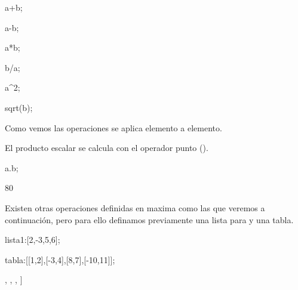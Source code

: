 \begin{maximai}
	a+b;
\end{maximai}\begin{maximao}
	\left[ 7 , 9 , 11 , 13 , 5 \right]
\end{maximao}\begin{maximai}
	a-b;
\end{maximai}\begin{maximao}
	\left[ -5 , -5 , -5 , -5 , 5 \right]
\end{maximao}\begin{maximai}
	a*b;
\end{maximai}\begin{maximao}
	\left[ 6 , 14 , 24 , 36 , 0 \right]
\end{maximao}\begin{maximai}
	b/a;
\end{maximai}\begin{maximao}
\end{maximao}\begin{maximai}
	a^2;
\end{maximai}\begin{maximao}
	\left[ 1 , 4 , 9 , 16 , 25 \right]
\end{maximao}\begin{maximai}
	sqrt(b);
\end{maximai}\begin{maximao}
\end{maximao}

Como vemos las operaciones se aplica elemento a elemento.

El producto escalar se calcula con el operador punto ().
\begin{maximai}
	a.b;
\end{maximai}\begin{maximao}
	80
\end{maximao}

Existen otras operaciones definidas en maxima como las que veremos
a continuación, pero para ello definamos previamente una lista para
y una tabla.

\begin{maximai}
	lista1:[2,-3,5,6];
\end{maximai}\begin{maximao}
	\left[ 2 , -3 , 5 , 6 \right]
\end{maximao}\begin{maximai}
	tabla:[[1,2],[-3,4],[8,7],[-10,11]];
\end{maximai}\begin{maximao}
	\left[ \left[ 1 , 2 \right]  , \left[ -3 , 4 \right]  , \left[ 8 ,
	7 \right]  , \left[ -10 , 11 \right]  \right]
\end{maximao}

